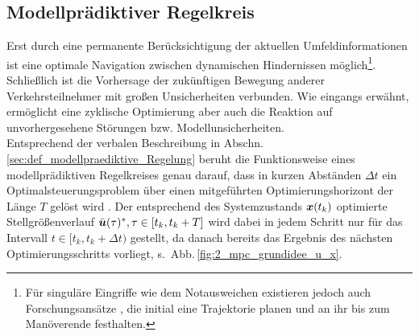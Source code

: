 \subsection{Modellprädiktiver Regelkreis}
Erst durch eine permanente Berücksichtigung der aktuellen Umfeldinformationen ist eine optimale Navigation zwischen dynamischen Hindernissen möglich\footnote{Für singuläre Eingriffe wie dem Notausweichen existieren jedoch auch Forschungsansätze \cite{isermann2008anticollision, Bender2007, keller2011active}, die initial eine Trajektorie planen und an ihr bis zum Manöverende festhalten.}. Schließlich ist die Vorhersage der zukünftigen Bewegung anderer Verkehrsteilnehmer mit großen Unsicherheiten verbunden. Wie eingangs erwähnt, ermöglicht eine zyklische Optimierung aber auch die Reaktion auf unvorhergesehene Störungen bzw. Modellunsicherheiten. \\
Entsprechend der verbalen Beschreibung in Abschn.\,\ref{sec:def_modellpraediktive_Regelung} beruht die Funktionsweise eines modellprädiktiven Regelkreises genau darauf, dass in kurzen Abständen $\Delta t$ ein Optimalsteuerungsproblem über einen \iA mitgeführten Optimierungshorizont der Länge $T$ gelöst wird \cite{gruene2011nonlinear, Johansen2011, Findeisen2002, graichen2014SkriptOpt}. 
Der entsprechend des Systemzustands $\boldsymbol{x}(t_k)$ optimierte Stellgrößenverlauf $\bar{\boldsymbol{u}}(\tau)^\ast, \tau \in [t_k, t_k+T]$ wird dabei in jedem Schritt nur für das Intervall $t\in [t_k, t_k+\Delta t)$ gestellt, da danach bereits das Ergebnis des nächsten Optimierungsschritts vorliegt, s.\ Abb.\,\ref{fig:2_mpc_grundidee_u_x}.
